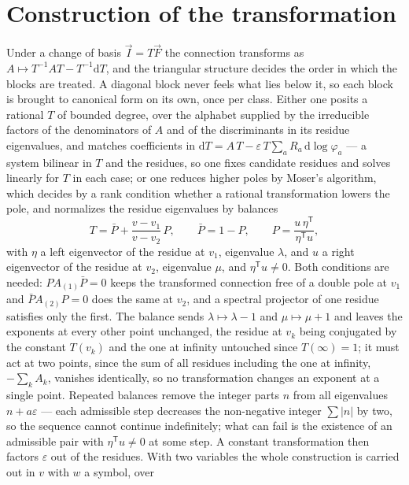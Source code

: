 \documentclass[11pt]{article}
\newcommand{\eps}{\varepsilon}
\newcommand{\dd}{\mathrm{d}}
\begin{document}
\section{Construction of the transformation}
Under a change of basis $\vec I = T\vec F$ the connection transforms
as $A \mapsto T^{-1}AT - T^{-1}\dd T$, and the triangular structure
decides the order in which the blocks are treated.  A diagonal block
never feels what lies below it, so each block is brought to canonical
form on its own, once per class.  Either one posits a rational $T$ of
bounded degree, over the alphabet supplied by the irreducible factors
of the denominators of $A$ and of the discriminants in its residue
eigenvalues, and matches coefficients in
$\dd T = A\,T - \eps\,T\sum_a R_a\,\dd\log\varphi_a$ --- a system
bilinear in $T$ and the residues, so one fixes candidate residues and
solves linearly for $T$ in each case; or one reduces higher poles by
Moser's algorithm, which decides by a rank condition whether a
rational transformation lowers the pole, and normalizes the residue
eigenvalues by balances
\begin{equation}
  T = \bar P + \frac{v-v_1}{v-v_2}\,P ,
  \qquad \bar P = 1-P ,
  \qquad P = \frac{u\,\eta^{\mathsf T}}{\eta^{\mathsf T}u} ,
\end{equation}
with $\eta$ a left eigenvector of the residue at $v_1$, eigenvalue
$\lambda$, and $u$ a right eigenvector of the residue at $v_2$,
eigenvalue $\mu$, and $\eta^{\mathsf T}u \ne 0$.  Both conditions are
needed: $PA_{(1)}\bar P = 0$ keeps the transformed connection free of
a double pole at $v_1$ and $\bar P A_{(2)}P = 0$ does the same at
$v_2$, and a spectral projector of one residue satisfies only the
first.  The balance sends $\lambda\mapsto\lambda-1$ and
$\mu\mapsto\mu+1$ and leaves the exponents at every other point
unchanged, the residue at $v_k$ being conjugated by the constant
$T(v_k)$ and the one at infinity untouched since $T(\infty)=1$; it
must act at two points, since the sum of all residues including the
one at infinity, $-\sum_k A_k$, vanishes identically, so no
transformation changes an exponent at a single point.  Repeated
balances remove the integer parts $n$ from all eigenvalues
$n + a\eps$ --- each admissible step decreases the non-negative
integer $\sum|n|$ by two, so the sequence cannot continue
indefinitely; what can fail is the existence of an admissible pair with
$\eta^{\mathsf T}u \neq 0$ at some step.  A constant transformation
then factors $\eps$ out of the residues.  With two variables the whole
construction is carried out in $v$ with $w$ a symbol, over
\end{document}
